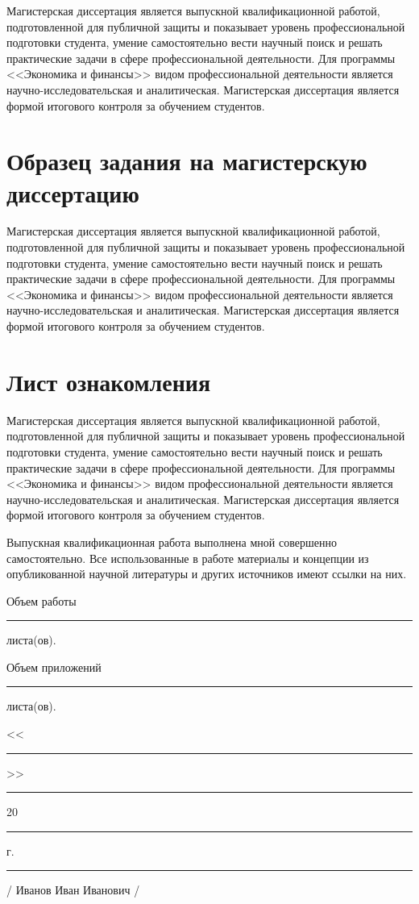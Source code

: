 \documentclass[12pt,a4paper, oneside]{extreport}
\begin{document}
Магистерская диссертация является выпускной квалификационной работой, подготовленной для публичной защиты и показывает уровень профессиональной подготовки студента, умение самостоятельно вести научный поиск и решать практические задачи в сфере профессиональной деятельности. Для программы <<Экономика и финансы>> видом профессиональной деятельности является научно-исследовательская и аналитическая. Магистерская диссертация является формой итогового контроля за обучением студентов.


\chapter[Образец задания на магистерскую диссертацию]{Образец задания на магистерскую\\ диссертацию}

Магистерская диссертация является выпускной квалификационной работой, подготовленной для публичной защиты и показывает уровень профессиональной подготовки студента, умение самостоятельно вести научный поиск и решать практические задачи в сфере профессиональной деятельности. Для программы <<Экономика и финансы>> видом профессиональной деятельности является научно-исследовательская и аналитическая. Магистерская диссертация является формой итогового контроля за обучением студентов.


\chapter[Лист ознакомления]{Лист ознакомления}

Магистерская диссертация является выпускной квалификационной работой, подготовленной для публичной защиты и показывает уровень профессиональной подготовки студента, умение самостоятельно вести научный поиск и решать практические задачи в сфере профессиональной деятельности. Для программы <<Экономика и финансы>> видом профессиональной деятельности является научно-исследовательская и аналитическая. Магистерская диссертация является формой итогового контроля за обучением студентов.


\newpage
\thispagestyle{empty}


Выпускная квалификационная работа выполнена мной совершенно самостоятельно. Все использованные в работе материалы и концепции из опубликованной научной литературы и других источников имеют ссылки на них.

\vspace{2ex}

 Объем работы  \rule{2em}{0.5pt} листа(ов).

\vspace{2ex}

 Объем приложений \rule{2em}{0.5pt} листа(ов).

\vspace{4ex}

\noindent << \rule{1em}{0.5pt} >> \rule{5em}{0.5pt} 20 \rule{1.4em}{0.5pt} г. 

\vspace{4ex}

\noindent \rule{11em}{0.5pt} \hspace{8em} / Иванов Иван Иванович /
\end{document}
